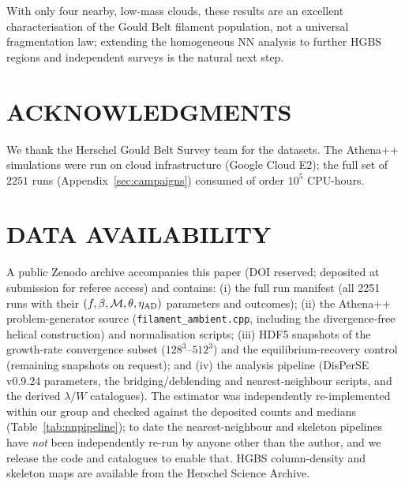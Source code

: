 \documentclass[usenatbib,twoside,twocolumn]{mnras}
\begin{document}
\smallskip\noindent With only four nearby, low-mass clouds, these results are an excellent characterisation of the Gould Belt filament population, not a universal fragmentation law; extending the homogeneous NN analysis to further HGBS regions and independent surveys is the natural next step.

\section*{ACKNOWLEDGMENTS}

We thank the Herschel Gould Belt Survey team for the datasets. The Athena++ simulations were run on cloud infrastructure (Google Cloud E2); the full set of $2251$ runs (Appendix~\ref{sec:campaigns}) consumed of order $10^5$ CPU-hours.

\section*{DATA AVAILABILITY}

A public Zenodo archive accompanies this paper (DOI reserved; deposited at submission for referee access) and contains: (i) the full run manifest (all 2251 runs with their $(f,\beta,\mathcal{M},\theta,\eta_{\rm AD})$ parameters and outcomes); (ii) the Athena++ problem-generator source (\texttt{filament\_ambient.cpp}, including the divergence-free helical construction) and normalisation scripts; (iii) HDF5 snapshots of the growth-rate convergence subset ($128^3$--$512^3$) and the equilibrium-recovery control (remaining snapshots on request); and (iv) the analysis pipeline (DisPerSE v0.9.24 parameters, the bridging/deblending and nearest-neighbour scripts, and the derived $\lambda/W$ catalogues). The estimator was independently re-implemented within our group and checked against the deposited counts and medians (Table~\ref{tab:nnpipeline}); to date the nearest-neighbour and skeleton pipelines have \emph{not} been independently re-run by anyone other than the author, and we release the code and catalogues to enable that. HGBS column-density and skeleton maps are available from the Herschel Science Archive.


\appendix
\end{document}

